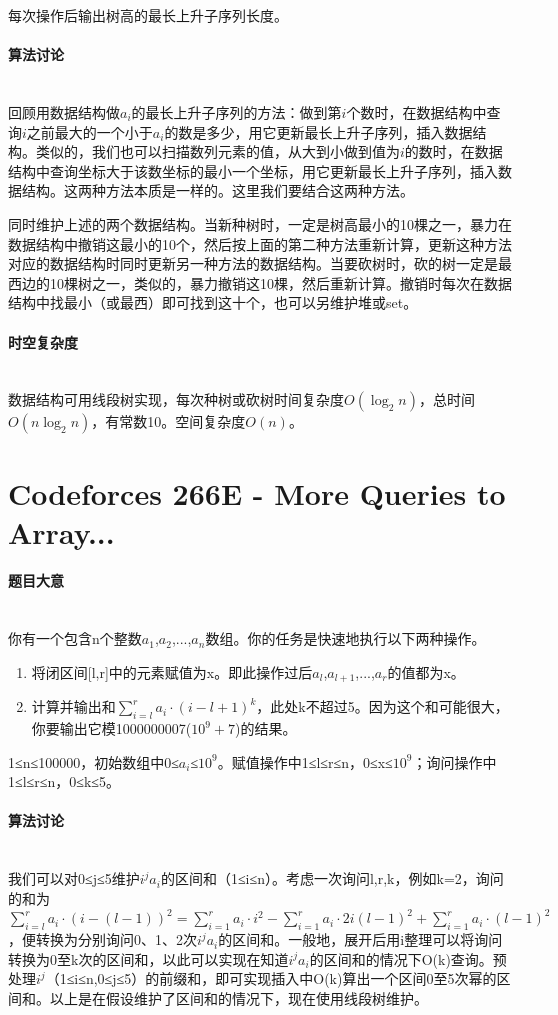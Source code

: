 \documentclass[UTF8]{ctexart}
\newcommand{\myparagraph}[1]{\paragraph{#1}\mbox{}\\}
\theoremstyle{nonumberplain}
\begin{document}
			每次操作后输出树高的最长上升子序列长度。
		
		\myparagraph{算法讨论}
		
			回顾用数据结构做${a_i}$的最长上升子序列的方法：做到第$i$个数时，在数据结构中查询$i$之前最大的一个小于$a_i$的数是多少，用它更新最长上升子序列，插入数据结构。类似的，我们也可以扫描数列元素的值，从大到小做到值为$i$的数时，在数据结构中查询坐标大于该数坐标的最小一个坐标，用它更新最长上升子序列，插入数据结构。这两种方法本质是一样的。这里我们要结合这两种方法。
			
			同时维护上述的两个数据结构。当新种树时，一定是树高最小的10棵之一，暴力在数据结构中撤销这最小的10个，然后按上面的第二种方法重新计算，更新这种方法对应的数据结构时同时更新另一种方法的数据结构。当要砍树时，砍的树一定是最西边的10棵树之一，类似的，暴力撤销这10棵，然后重新计算。撤销时每次在数据结构中找最小（或最西）即可找到这十个，也可以另维护堆或set。
		
		\myparagraph{时空复杂度}
		
			数据结构可用线段树实现，每次种树或砍树时间复杂度$O(\log_2n)$，总时间$O(n\log_2n)$，有常数10。空间复杂度$O(n)$。
	
	\section{Codeforces 266E - More Queries to Array...}
	
		\myparagraph{题目大意}
		
			你有一个包含n个整数$a_1$,$a_2$,...,$a_n$数组。你的任务是快速地执行以下两种操作。
			
			\begin{enumerate}[leftmargin=15mm]
				\item 将闭区间{[l,r]}中的元素赋值为x。即此操作过后$a_l$,$a_{l+1}$,...,$a_r$的值都为x。
				\item 计算并输出和$\sum_{i=l}^r a_i \cdot (i-l+1)^k$，此处k不超过5。因为这个和可能很大，你要输出它模1000000007($10^9+7$)的结果。
			\end{enumerate}
			
			1≤n≤100000，初始数组中0≤$a_i$≤$10^9$。赋值操作中1≤l≤r≤n，0≤x≤$10^9$；询问操作中1≤l≤r≤n，0≤k≤5。
			
		\myparagraph{算法讨论}
		
			我们可以对0≤j≤5维护$i^j a_i$的区间和（1≤i≤n）。考虑一次询问l,r,k，例如k=2，询问的和为$\sum_{i=l}^r  a_i \cdot (i-(l-1))^2 = \sum_{i=1}^r  a_i \cdot i^2 - \sum_{i=1}^r  a_i \cdot 2i(l-1)^2 + \sum_{i=1}^r  a_i \cdot (l-1)^2$，便转换为分别询问0、1、2次$i^j a_i$的区间和。一般地，展开后用i整理可以将询问转换为0至k次的区间和，以此可以实现在知道$i^j a_i$的区间和的情况下O(k)查询。预处理$i^j$（1≤i≤n,0≤j≤5）的前缀和，即可实现插入中O(k)算出一个区间0至5次幂的区间和。以上是在假设维护了区间和的情况下，现在使用线段树维护。
			
\end{document}
